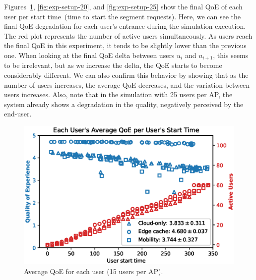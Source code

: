 Figures~\ref{fig:exp-setup-15}, \ref{fig:exp-setup-20}, and \ref{fig:exp-setup-25} show the final QoE of each user per start time~(time to start the segment requests). Here, we can see the final QoE degradation for each user's entrance during the simulation execution. The red plot represents the number of active users simultaneously. 
As users reach the final QoE in this experiment, it tends to be slightly lower than the previous one. When looking at the final QoE delta between users $u_{i}$ and $u_{i + 1}$, this seems to be irrelevant, but as we increase the delta, the QoE starts to become considerably different. We can also confirm this behavior by showing that as the number of users increases, the average QoE decreases, and the variation between users increases. Also, note that in the simulation with 25 users per AP, the system already shows a degradation in the quality, negatively perceived by the end-user.

\begin{figure}[!htb]
    \centering
    \includegraphics[width=1.1\linewidth]{images/UserQoExUserStartTime15users.eps}
    \vspace{-0.5cm}
    \caption{Average QoE for each user (15 users per AP).}
    \label{fig:exp-setup-15}
\end{figure}

